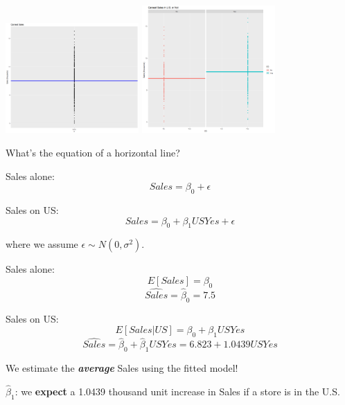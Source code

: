 \begin{frame}
\begin{center}
	\includegraphics[width = 2in]{SalesPointsMean.png}
	\includegraphics[width = 2in]{SalesUSPointsMeans.png}
\end{center}
\bi
	\item What's the equation of a horizontal line? 
\ei
\end{frame}

\begin{frame}
\bi
	\item Sales alone:
	\[
		Sales = \beta_0 + \epsilon
	\]
	
	\pause
	\item Sales on US:
	\[
		Sales = \beta_0 + \beta_1 USYes + \epsilon
	\]
	
	\item where we assume $\epsilon \sim N(0, \sigma^2)$.
\ei
\end{frame}

\begin{frame}
\bi
	\item Sales alone:
	\[
		E[Sales] = \beta_0
	\]
	\[
		\hat{Sales} = \hat{\beta}_0  = 7.5
	\]
	
	\pause
	\item Sales on US:
	\[
		E[Sales \vert US] = \beta_0 + \beta_1 USYes
	\]
	\[
		\hat{Sales} = \hat{\beta}_0 + \hat{\beta}_1 USYes = 6.823 + 1.0439USYes
	\]
	
	\item We estimate the \textbf{\emph{average}} Sales using the fitted model!
	\item $\hat{\beta}_1$: we \textbf{expect} a 1.0439 thousand unit increase in Sales if a store is in the U.S.
\ei
\end{frame}

